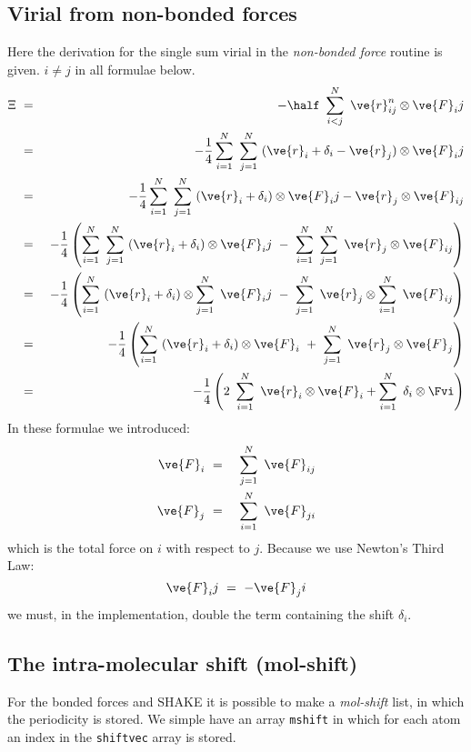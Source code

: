 \subsection{Virial from non-bonded forces}
Here the derivation for the single sum virial in the {\em non-bonded force} 
routine is given. $i \neq j$ in all formulae below.
\newcommand{\di}{\delta_{i}}
\newcommand{\qrt}{\frac{1}{4}}
\begin{eqnarray}
\Xi	
&~=~&-\half~\sum_{i < j}^{N}~\ve{r}_{ij}^n\otimes\ve{F}_ij				\\
&~=~&-\qrt\sum_{i=1}^N~\sum_{j=1}^N ~(\ve{r}_i+\di-\ve{r}_j)\otimes\ve{F}_ij	\\
&~=~&-\qrt\sum_{i=1}^N~\sum_{j=1}^N ~(\ve{r}_i+\di)\otimes\ve{F}_ij-\ve{r}_j\otimes\ve{F}_{ij}	\\
&~=~&-\qrt\left(\sum_{i=1}^N~\sum_{j=1}^N ~(\ve{r}_i+\di)\otimes\ve{F}_ij~-~\sum_{i=1}^N~\sum_{j=1}^N ~\ve{r}_j\otimes\ve{F}_{ij}\right)	\\
&~=~&-\qrt\left(\sum_{i=1}^N~(\ve{r}_i+\di)\otimes\sum_{j=1}^N~\ve{F}_ij~-~\sum_{j=1}^N ~\ve{r}_j\otimes\sum_{i=1}^N~\ve{F}_{ij}\right)	\\
&~=~&-\qrt\left(\sum_{i=1}^N~(\ve{r}_i+\di)\otimes\ve{F}_i~+~\sum_{j=1}^N ~\ve{r}_j\otimes\ve{F}_j\right)	\\
&~=~&-\qrt\left(2~\sum_{i=1}^N~\ve{r}_i\otimes\ve{F}_i+\sum_{i=1}^N~\di\otimes\Fvi\right)
\end{eqnarray}
In these formulae we introduced:
\begin{eqnarray}
\ve{F}_i&~=~&\sum_{j=1}^N~\ve{F}_{ij}					\\
\ve{F}_j&~=~&\sum_{i=1}^N~\ve{F}_{ji}
\end{eqnarray}
which is the total force on $i$ with respect to $j$. Because we use Newton's Third Law:
\begin{equation}
\ve{F}_ij~=~-\ve{F}_ji
\end{equation}
we must, in the implementation, double the term containing the shift $\delta_i$.

\subsection{The intra-molecular shift (mol-shift)}
For the bonded forces and SHAKE it is possible to make a {\em mol-shift}
list, in which the periodicity is stored. We simple have an array {\tt mshift}
in which for each atom an index in the {\tt shiftvec} array is stored.

